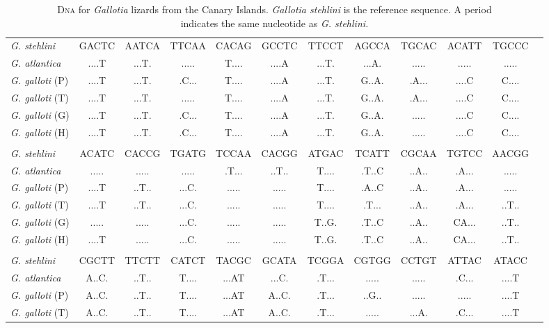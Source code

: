 \documentclass[12pt, hidelinks]{exam}
\begin{document}
\begin{landscape}

{\fontsize{11pt}{13pt}\selectfont
\dnatable
\begin{longtable}[l]{lccccccccccc}
\caption{D\textsc{na} for \textit{Gallotia} lizards from the Canary Islands. \textit{Gallotia stehlini} is the reference sequence. A period \\indicates the same nucleotide as \textit{G. stehlini.}\label{tab:dna_results}}\tabularnewline
\toprule
{\regfont\textit{G. stehlini}}	& GACTC & AATCA & TTCAA & CACAG & GCCTC & TTCCT & AGCCA & TGCAC & ACATT & TGCCC \tabularnewline
{\regfont\textit{G. atlantica}}	& ....T & ...T. & ..... & T.... & ....A & ...T. & ...A. & ..... & ..... & ..... \tabularnewline
{\regfont\textit{G. galloti} (P)}	& ....T & ...T. & .C... & T.... & ....A & ...T. & G..A. & .A... & ....C & C.... \tabularnewline
{\regfont\textit{G. galloti} (T)}	& ....T & ...T. & ..... & T.... & ....A & ...T. & G..A. & .A... & ....C & C.... \tabularnewline
{\regfont\textit{G. galloti} (G)}	& ....T & ...T. & .C... & T.... & ....A & ...T. & G..A. & ..... & ....C & C.... \tabularnewline
{\regfont\textit{G. galloti} (H)}	& ....T & ...T. & .C... & T.... & ....A & ...T. & G..A. & ..... & ....C & C.... \tabularnewline%
&&&&&&&&&&\tabularnewline
{\regfont\textit{G. stehlini}}	& ACATC & CACCG & TGATG & TCCAA & CACGG & ATGAC & TCATT & CGCAA & TGTCC & AACGG \tabularnewline
{\regfont\textit{G. atlantica}}	& ..... & ..... & ..... & .T... & ..T.. & T.... & .T..C & ..A.. & .A... & ..... \tabularnewline
{\regfont\textit{G. galloti} (P)}	& ....T & ..T.. & ...C. & ..... & ..... & T.... & .A..C & ..A.. & .A... & ..... \tabularnewline
{\regfont\textit{G. galloti} (T)}	& ....T & ..T.. & ...C. & ..... & ..... & T.... & .T... & ..A.. & .A... & ..T.. \tabularnewline
{\regfont\textit{G. galloti} (G)}	& ..... & ..... & ...C. & ..... & ..... & T..G. & .T..C & ..A.. & CA... & ..T.. \tabularnewline
{\regfont\textit{G. galloti} (H)}	& ....T & ..... & ...C. & ..... & ..... & T..G. & .T..C & ..A.. & CA... & ..T.. \tabularnewline
&&&&&&&&&&\tabularnewline
{\regfont\textit{G. stehlini}}	& CGCTT & TTCTT & CATCT & TACGC & GCATA & TCGGA & CGTGG & CCTGT & ATTAC & ATACC \tabularnewline
{\regfont\textit{G. atlantica}}	& A..C. & ..T.. & T.... & ...AT & ...C. & .T... & ..... & ..... & .C... & ....T \tabularnewline
{\regfont\textit{G. galloti} (P)}	& A..C. & ..T.. & T.... & ...AT & A..C. & .T... & ..G.. & ..... & ..... & ....T \tabularnewline
{\regfont\textit{G. galloti} (T)}	& A..C. & ..T.. & T.... & ...AT & A..C. & .T... & ..... & ...A. & .C... & ....T \tabularnewline

\end{longtable}}
\end{landscape}
\end{document}
